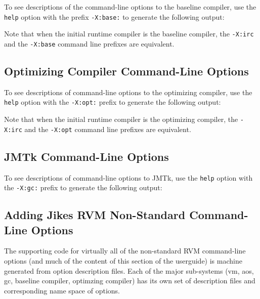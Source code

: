 To see descriptions of the command-line options to the baseline
compiler, use the {\tt help} option with the prefix {\tt -X:base:} 
to generate the following output:

\T \begin{small}

\T \end{small}
 
Note that when the initial runtime compiler is the baseline compiler, 
the {\tt -X:irc} and the {\tt -X:base} command line prefixes are equivalent.

\subsection{Optimizing Compiler Command-Line Options}
\label{section:nonadaptive:optimizing:options}

To see descriptions of command-line options to the optimizing compiler,
use the {\tt help} option with the {\tt -X:opt:} prefix 
to generate the following output:

\T \begin{tiny}

\T \end{tiny}

Note that when the initial runtime compiler is the optimizing compiler, 
the {\tt -X:irc} and the {\tt -X:opt} command line prefixes are equivalent.

\subsection{JMTk Command-Line Options}
\label{section:jmtkoptions}

To see descriptions of command-line options to JMTk,
use the {\tt help} option with the {\tt -X:gc:} prefix 
to generate the following output:

\T \begin{tiny}

\T \end{tiny}

\subsection{Adding Jikes RVM Non-Standard Command-Line Options}
The supporting code for virtually all of the non-standard
\JikesTM{} RVM command-line options (and much of the content of
this section of the userguide) is machine generated from
option description files.  Each of the major sub-systems (vm, aos, gc,
baseline compiler, optimzing compiler) has its own set of description
files and corresponding name space of options. 

